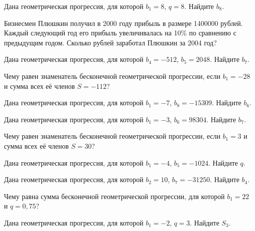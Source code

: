 \documentclass[4apaper]{article}
\begin{document}
\begin{taskBN}{8}
Дана геометрическая прогрессия, для которой $b_1 = 8$, $q=8$. Найдите $b_{8}$.
\end{taskBN}

\begin{taskBN}{9}
Бизнесмен Плюшкин получил в 2000 году прибыль в размере 1400000 рублей. Каждый следующий год его прибыль увеличивалась на 10\% по сравнению с предыдущим годом. Сколько рублей заработал Плюшкин за 2004 год?
\end{taskBN}

\begin{taskBN}{10}
Дана геометрическая прогрессия, для которой $b_{4} = -512$, $b_{5}=2048$. Найдите $b_{7}$.
\end{taskBN}

\begin{taskBN}{11}
Чему равен знаменатель бесконечной геометрической прогрессии, если $b_1 = -28$ и сумма всех её членов $S=-112$?
\end{taskBN}

\begin{taskBN}{12}
Дана геометрическая прогрессия, для которой $b_1 = -7$, $b_{8}=-15309$. Найдите $b_{6}$.
\end{taskBN}

\begin{taskBN}{13}
Дана геометрическая прогрессия, для которой $b_1 = -3$, $b_{6}=98304$. Найдите $b_{7}$.
\end{taskBN}

\begin{taskBN}{14}
Чему равен знаменатель бесконечной геометрической прогрессии, если $b_1 = 3$ и сумма всех её членов $S=30$?
\end{taskBN}

\begin{taskBN}{15}
Дана геометрическая прогрессия, для которой $b_1 = -4$, $b_{5}=-1024$. Найдите $q$.
\end{taskBN}

\begin{taskBN}{16}
Дана геометрическая прогрессия, для которой $b_{2} = 10$, $b_{7}=-31250$. Найдите $b_{4}$.
\end{taskBN}

\begin{taskBN}{17}
Чему равна сумма бесконечной геометрической прогрессии, для которой $b_1 = 22$ и $q=0,75$?
\end{taskBN}

\begin{taskBN}{18}
Дана геометрическая прогрессия, для которой $b_1 = -2$, $q=3$. Найдите $S_{3}$.
\end{taskBN}
\end{document}
